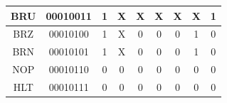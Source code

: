 \documentclass[a4paper,14pt]{article}
\begin{document}
\begin{table}[!h]
\begin{tabular}{lllllllll}
\multicolumn{1}{|c|}{BRU} & \multicolumn{1}{c|}{00010011} & \multicolumn{1}{c|}{1} & \multicolumn{1}{c|}{X} & \multicolumn{1}{c|}{X} & \multicolumn{1}{c|}{X} & \multicolumn{1}{c|}{X} & \multicolumn{1}{c|}{X} & \multicolumn{1}{c|}{1} \TBstrut \\[1em] \hline
\multicolumn{1}{|c|}{BRZ} & \multicolumn{1}{c|}{00010100} & \multicolumn{1}{c|}{1} & \multicolumn{1}{c|}{X} & \multicolumn{1}{c|}{0} & \multicolumn{1}{c|}{0} & \multicolumn{1}{c|}{0} & \multicolumn{1}{c|}{1} & \multicolumn{1}{c|}{0} \TBstrut \\[1em] \hline
\multicolumn{1}{|c|}{BRN} & \multicolumn{1}{c|}{00010101} & \multicolumn{1}{c|}{1} & \multicolumn{1}{c|}{X} & \multicolumn{1}{c|}{0} & \multicolumn{1}{c|}{0} & \multicolumn{1}{c|}{0} & \multicolumn{1}{c|}{1} & \multicolumn{1}{c|}{0} \TBstrut \\[1em] \hline
\multicolumn{1}{|c|}{NOP} & \multicolumn{1}{c|}{00010110} & \multicolumn{1}{c|}{0} & \multicolumn{1}{c|}{0} & \multicolumn{1}{c|}{0} & \multicolumn{1}{c|}{0} & \multicolumn{1}{c|}{0} & \multicolumn{1}{c|}{0} & \multicolumn{1}{c|}{0} \TBstrut \\[1em] \hline
\multicolumn{1}{|c|}{HLT} & \multicolumn{1}{c|}{00010111} & \multicolumn{1}{c|}{0} & \multicolumn{1}{c|}{0} & \multicolumn{1}{c|}{0} & \multicolumn{1}{c|}{0} & \multicolumn{1}{c|}{0} & \multicolumn{1}{c|}{0} & \multicolumn{1}{c|}{0} \TBstrut \\[1em] \hline
\end{tabular}
\end{table}
\end{document}
